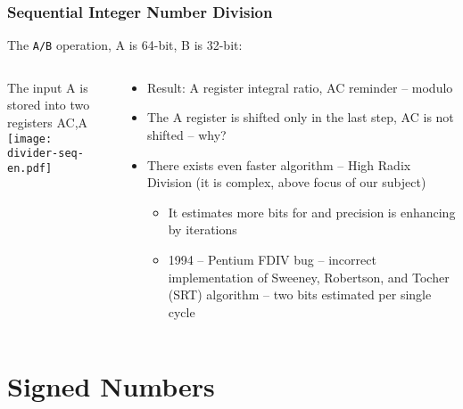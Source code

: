 \documentclass{beamer}
\begin{document}
\begin{frame}
\frametitle{Sequential Integer Number Division}

The \texttt{A/B} operation, A is 64-bit, B is 32-bit:\\
\begin{columns}
\begin{column}{0.45\textwidth}
The input A is stored into two registers AC,A\\
\texttt{[image: divider-seq-en.pdf]}
\end{column}
\hfill
\begin{column}{0.55\textwidth}
\begin{itemize}
\item Result: A register integral ratio, AC reminder -- modulo
\item The A register is shifted only in the last step, AC is not shifted -- why?
\item There exists even faster algorithm -- High Radix Division (it is complex, above focus of our subject)
\begin{itemize}
\item It estimates more bits for and precision is enhancing by iterations
\item 1994 -- Pentium FDIV bug -- incorrect implementation of Sweeney, Robertson, and Tocher (SRT) algorithm -- two bits estimated per single cycle
\end{itemize}
\end{itemize}
\end{column}
\end{columns}


\end{frame}


\section{Signed Numbers}
\end{document}
